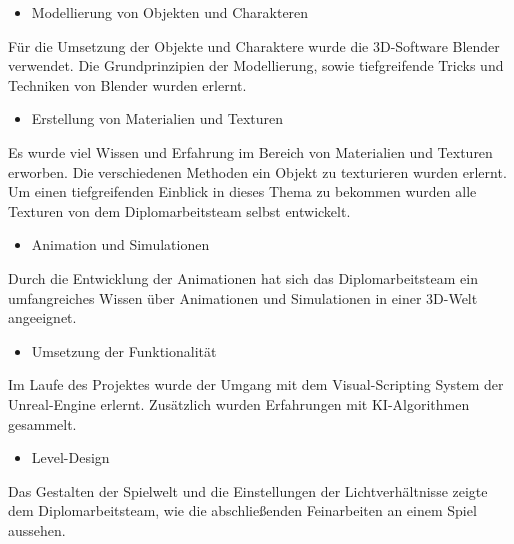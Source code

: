 \documentclass[
    headings=optiontotocandhead,%
    twoside,
    numbers=noenddot,%
    toc=flat, %
    12pt, %
    titlepage, %
    parskip=full, %
    listof=totoc, %
    listof=flat, %
    numbers=noenddot, %
    bibliography=totoc, %
    a4paper,DIV=14,
    BCOR=15mm,
]{scrbook}
\begin{document}
\begin{itemize}
    \item  Modellierung von Objekten und Charakteren
\end{itemize}
Für die Umsetzung der Objekte und Charaktere wurde die 3D-Software Blender verwendet.
Die Grundprinzipien der Modellierung, sowie tiefgreifende Tricks und Techniken von Blender wurden erlernt.

\begin{itemize}
    \item  Erstellung von Materialien und Texturen
\end{itemize}
Es wurde viel Wissen und Erfahrung im Bereich von Materialien und Texturen erworben.
Die verschiedenen Methoden ein Objekt zu texturieren wurden erlernt.
Um einen tiefgreifenden Einblick in dieses Thema zu bekommen wurden alle Texturen von dem Diplomarbeitsteam selbst entwickelt.

\begin{itemize}
    \item  Animation und Simulationen
\end{itemize}
Durch die Entwicklung der Animationen hat sich das Diplomarbeitsteam ein umfangreiches Wissen über Animationen und
Simulationen in einer 3D-Welt angeeignet.

\begin{itemize}
    \item Umsetzung der Funktionalität
\end{itemize}
Im Laufe des Projektes wurde der Umgang mit dem Visual-Scripting System der Unreal-Engine erlernt.
Zusätzlich wurden Erfahrungen mit KI-Algorithmen gesammelt.

\begin{itemize}
    \item Level-Design
\end{itemize}
Das Gestalten der Spielwelt und die Einstellungen der Lichtverhältnisse zeigte dem Diplomarbeitsteam, wie die
abschließenden Feinarbeiten an einem Spiel aussehen.

%
%

\end{document}
